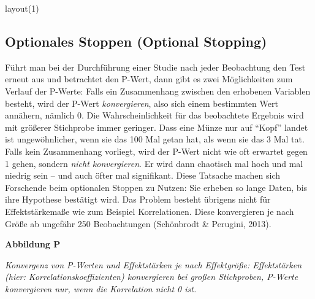 \documentclass[
  letterpaper,
  DIV=11,
  numbers=noendperiod]{scrreprt}
\newenvironment{Shaded}{\begin{snugshade}}{\end{snugshade}}
\newcommand{\DecValTok}[1]{\textcolor[rgb]{0.68,0.00,0.00}{#1}}
\newcommand{\FunctionTok}[1]{\textcolor[rgb]{0.28,0.35,0.67}{#1}}
\newcommand{\NormalTok}[1]{\textcolor[rgb]{0.00,0.23,0.31}{#1}}
\begin{document}
\begin{Shaded}
\begin{Highlighting}[]
\FunctionTok{layout}\NormalTok{(}\DecValTok{1}\NormalTok{)}
\end{Highlighting}
\end{Shaded}

\subsection{Optionales Stoppen (Optional
Stopping)}\label{optionales-stoppen-optional-stopping}

Führt man bei der Durchführung einer Studie nach jeder Beobachtung den
Test erneut aus und betrachtet den P-Wert, dann gibt es zwei
Möglichkeiten zum Verlauf der P-Werte: Falls ein Zusammenhang zwischen
den erhobenen Variablen besteht, wird der P-Wert \emph{konvergieren},
also sich einem bestimmten Wert annähern, nämlich 0. Die
Wahrscheinlichkeit für das beobachtete Ergebnis wird mit größerer
Stichprobe immer geringer. Dass eine Münze nur auf ``Kopf'' landet ist
ungewöhnlicher, wenn sie das 100 Mal getan hat, als wenn sie das 3 Mal
tat. Falls kein Zusammenhang vorliegt, wird der P-Wert nicht wie oft
erwartet gegen 1 gehen, sondern \emph{nicht konvergieren}. Er wird dann
chaotisch mal hoch und mal niedrig sein -- und auch öfter mal
signifikant. Diese Tatsache machen sich Forschende beim optionalen
Stoppen zu Nutzen: Sie erheben so lange Daten, bis ihre Hypothese
bestätigt wird. Das Problem besteht übrigens nicht für Effektstärkemaße
wie zum Beispiel Korrelationen. Diese konvergieren je nach Größe ab
ungefähr 250 Beobachtungen (Schönbrodt \& Perugini, 2013).

\textbf{Abbildung P}

\emph{Konvergenz von P-Werten und Effektstärken je nach Effektgröße:
Effektstärken (hier: Korrelationskoeffizienten) konvergieren bei großen
Stichproben, P-Werte konvergieren nur, wenn die Korrelation nicht 0
ist.}
\end{document}
